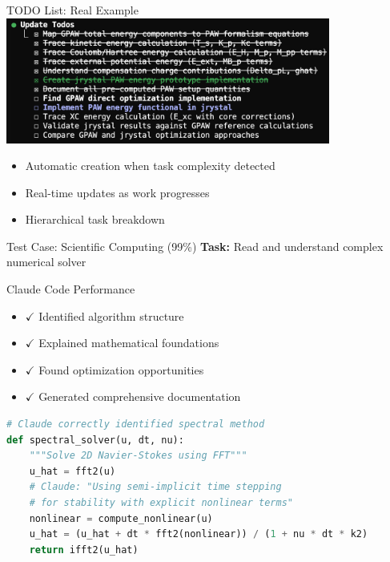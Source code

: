 \documentclass[aspectratio=169]{beamer}
\begin{document}
\begin{frame}{TODO List: Real Example}
	\includegraphics[width=0.8\textwidth]{fig/TODO2.jpg}
	
	\begin{itemize}
		\item {\color{highlight}Automatic creation} when task complexity detected
		\item {\color{highlight}Real-time updates} as work progresses
		\item {\color{highlight}Hierarchical} task breakdown
	\end{itemize}
\end{frame}

\begin{frame}[fragile]{Test Case: Scientific Computing (99\%)}
	\textbf{Task:} Read and understand complex numerical solver
	
	\begin{block}{Claude Code Performance}
		\begin{itemize}
			\item $\checkmark$ Identified algorithm structure
			\item $\checkmark$ Explained mathematical foundations
			\item $\checkmark$ Found optimization opportunities
			\item $\checkmark$ Generated comprehensive documentation
		\end{itemize}
	\end{block}
	
	\begin{lstlisting}[language=python, basicstyle=\tiny]
# Claude correctly identified spectral method
def spectral_solver(u, dt, nu):
    """Solve 2D Navier-Stokes using FFT"""
    u_hat = fft2(u)
    # Claude: "Using semi-implicit time stepping 
    # for stability with explicit nonlinear terms"
    nonlinear = compute_nonlinear(u)
    u_hat = (u_hat + dt * fft2(nonlinear)) / (1 + nu * dt * k2)
    return ifft2(u_hat)
	\end{lstlisting}
\end{frame}
\end{document}
